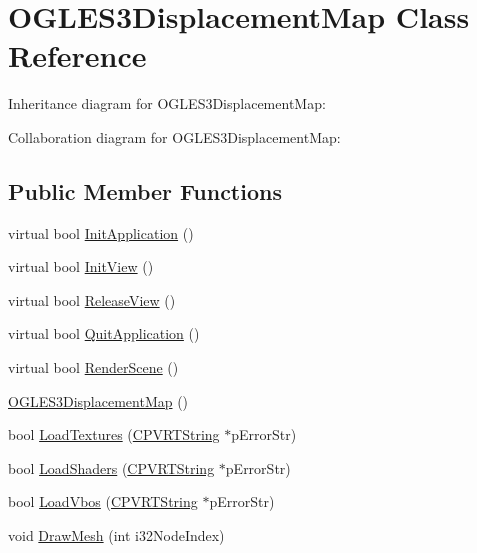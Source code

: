 \hypertarget{class_o_g_l_e_s3_displacement_map}{\section{O\+G\+L\+E\+S3\+Displacement\+Map Class Reference}
\label{class_o_g_l_e_s3_displacement_map}
}


Inheritance diagram for O\+G\+L\+E\+S3\+Displacement\+Map\+:


Collaboration diagram for O\+G\+L\+E\+S3\+Displacement\+Map\+:
\subsection*{Public Member Functions}
\begin{DoxyCompactItemize}
\item 
virtual bool \hyperlink{class_o_g_l_e_s3_displacement_map_a1a9f05729d4c7e9b3d81a8993556f327}{Init\+Application} ()
\item 
virtual bool \hyperlink{class_o_g_l_e_s3_displacement_map_a5493a4bba670b6d7cf926468b0a2a18f}{Init\+View} ()
\item 
virtual bool \hyperlink{class_o_g_l_e_s3_displacement_map_ac9c4f8829d4f2592bf4c237b4b6ab611}{Release\+View} ()
\item 
virtual bool \hyperlink{class_o_g_l_e_s3_displacement_map_af4a9799cc20966da8b623aeca709583d}{Quit\+Application} ()
\item 
virtual bool \hyperlink{class_o_g_l_e_s3_displacement_map_af2b5dede7fb0345dedfe1e3e87fbf7a7}{Render\+Scene} ()
\item 
\hyperlink{class_o_g_l_e_s3_displacement_map_aad4f1286c9d6a83692331a84f44facda}{O\+G\+L\+E\+S3\+Displacement\+Map} ()
\item 
bool \hyperlink{class_o_g_l_e_s3_displacement_map_a8c17de0a36619b8ffeda623b8b91f374}{Load\+Textures} (\hyperlink{class_c_p_v_r_t_string}{C\+P\+V\+R\+T\+String} $\ast$p\+Error\+Str)
\item 
bool \hyperlink{class_o_g_l_e_s3_displacement_map_a3e0d141df9482cebba966c9a9e8e16f7}{Load\+Shaders} (\hyperlink{class_c_p_v_r_t_string}{C\+P\+V\+R\+T\+String} $\ast$p\+Error\+Str)
\item 
bool \hyperlink{class_o_g_l_e_s3_displacement_map_a5ed7126a9ab1099d86a8be6bef84fafc}{Load\+Vbos} (\hyperlink{class_c_p_v_r_t_string}{C\+P\+V\+R\+T\+String} $\ast$p\+Error\+Str)
\item 
void \hyperlink{class_o_g_l_e_s3_displacement_map_ab550c2098864b97396af99cd8ab488e1}{Draw\+Mesh} (int i32\+Node\+Index)
\end{DoxyCompactItemize}


